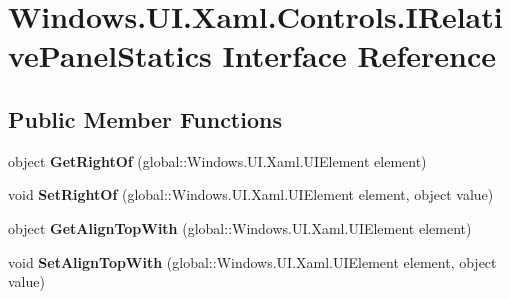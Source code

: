 \hypertarget{interface_windows_1_1_u_i_1_1_xaml_1_1_controls_1_1_i_relative_panel_statics}{}\section{Windows.\+U\+I.\+Xaml.\+Controls.\+I\+Relative\+Panel\+Statics Interface Reference}
\label{interface_windows_1_1_u_i_1_1_xaml_1_1_controls_1_1_i_relative_panel_statics}
\subsection*{Public Member Functions}
\begin{DoxyCompactItemize}
\item 
\mbox{\label{interface_windows_1_1_u_i_1_1_xaml_1_1_controls_1_1_i_relative_panel_statics_a9439a2bee522a760bbb857e11546ccbc}} 
object {\bfseries Get\+Right\+Of} (global\+::\+Windows.\+U\+I.\+Xaml.\+U\+I\+Element element)
\item 
\mbox{\label{interface_windows_1_1_u_i_1_1_xaml_1_1_controls_1_1_i_relative_panel_statics_a15d40b2bf729423b60fb36c9ccf5cbb3}} 
void {\bfseries Set\+Right\+Of} (global\+::\+Windows.\+U\+I.\+Xaml.\+U\+I\+Element element, object value)
\item 
\mbox{\label{interface_windows_1_1_u_i_1_1_xaml_1_1_controls_1_1_i_relative_panel_statics_a86922d469c65c9e55a474d71a379dfd3}} 
object {\bfseries Get\+Align\+Top\+With} (global\+::\+Windows.\+U\+I.\+Xaml.\+U\+I\+Element element)
\item 
\mbox{\label{interface_windows_1_1_u_i_1_1_xaml_1_1_controls_1_1_i_relative_panel_statics_a247393a7e98c060d1eeef69d45b8ffcd}} 
void {\bfseries Set\+Align\+Top\+With} (global\+::\+Windows.\+U\+I.\+Xaml.\+U\+I\+Element element, object value)
\item 
\mbox{\label{interface_windows_1_1_u_i_1_1_xaml_1_1_controls_1_1_i_relative_panel_statics_a191f33699f05cc8d162583cad90ff2b1}} 

\end{DoxyCompactItemize}
